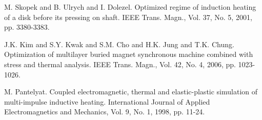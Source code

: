 
\begin{thebibliography}{10}

{\sc M. Skopek and B. Ulrych and I. Dolezel}. {Optimized regime of induction heating of a disk before its pressing on shaft}. IEEE Trans. Magn., Vol. 37, No. 5, 2001, pp. 3380-3383.



{\sc J.K. Kim and S.Y. Kwak and S.M. Cho and H.K. Jung and T.K. Chung}. {Optimization of multilayer buried magnet synchronous machine combined with stress and thermal analysis}. IEEE Trans. Magn., Vol. 42, No. 4, 2006, pp. 1023-1026.



{\sc M. Pantelyat}. {Coupled electromagnetic, thermal and elastic-plastic simulation of multi-impulse inductive heating}. International Journal of Applied Electromagnetics and Mechanics, Vol. 9, No. 1, 1998, pp. 11-24.

\end{thebibliography}
